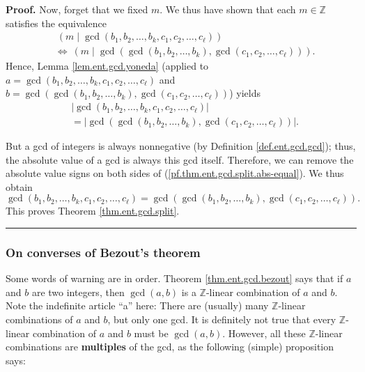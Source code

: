 \documentclass[numbers=enddot,12pt,final,onecolumn,notitlepage]{scrartcl}%
\numberwithin{exer}{subsection}
\theoremstyle{definition}
\newenvironment{proof}[1][Proof]{\noindent\textbf{#1.} }{\ \rule{0.5em}{0.5em}}
\begin{document}
\begin{proof}
Now, forget that we fixed $m$. We thus have shown that each $m\in\mathbb{Z}$
satisfies the equivalence%
\begin{align*}
&  \ \left(  m\mid\gcd\left(  b_{1},b_{2},\ldots,b_{k},c_{1},c_{2}%
,\ldots,c_{\ell}\right)  \right) \\
&  \Longleftrightarrow\ \left(  m\mid\gcd\left(  \gcd\left(  b_{1}%
,b_{2},\ldots,b_{k}\right)  ,\gcd\left(  c_{1},c_{2},\ldots,c_{\ell}\right)
\right)  \right)  .
\end{align*}
Hence, Lemma \ref{lem.ent.gcd.yoneda} (applied to $a=\gcd\left(  b_{1}%
,b_{2},\ldots,b_{k},c_{1},c_{2},\ldots,c_{\ell}\right)  $ and \newline%
$b=\gcd\left(  \gcd\left(  b_{1},b_{2},\ldots,b_{k}\right)  ,\gcd\left(
c_{1},c_{2},\ldots,c_{\ell}\right)  \right)  $) yields%
\begin{align}
&  \left\vert \gcd\left(  b_{1},b_{2},\ldots,b_{k},c_{1},c_{2},\ldots,c_{\ell
}\right)  \right\vert \nonumber\\
&  =\left\vert \gcd\left(  \gcd\left(  b_{1},b_{2},\ldots,b_{k}\right)
,\gcd\left(  c_{1},c_{2},\ldots,c_{\ell}\right)  \right)  \right\vert .
\label{pf.thm.ent.gcd.split.abs-equal}%
\end{align}


But a gcd of integers is always nonnegative (by Definition
\ref{def.ent.gcd.gcd}); thus, the absolute value of a gcd is always this gcd
itself. Therefore, we can remove the absolute value signs on both sides of
(\ref{pf.thm.ent.gcd.split.abs-equal}). We thus obtain%
\[
\gcd\left(  b_{1},b_{2},\ldots,b_{k},c_{1},c_{2},\ldots,c_{\ell}\right)
=\gcd\left(  \gcd\left(  b_{1},b_{2},\ldots,b_{k}\right)  ,\gcd\left(
c_{1},c_{2},\ldots,c_{\ell}\right)  \right)  .
\]
This proves Theorem \ref{thm.ent.gcd.split}.
\end{proof}

\subsubsection{On converses of Bezout's theorem}

Some words of warning are in order. Theorem \ref{thm.ent.gcd.bezout} says that
if $a$ and $b$ are two integers, then $\gcd\left(  a, b \right)  $ is a
$\mathbb{Z}$-linear combination of $a$ and $b$. Note the indefinite article
``a'' here: There are (usually) many $\mathbb{Z}$-linear combinations of $a$
and $b$, but only one gcd. It is definitely not true that every $\mathbb{Z}%
$-linear combination of $a$ and $b$ must be $\gcd\left(  a, b \right)  $.
However, all these $\mathbb{Z}$-linear combinations are \textbf{multiples} of
the gcd, as the following (simple) proposition says:
\end{document}
